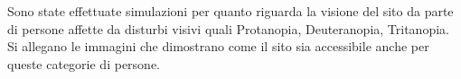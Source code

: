 \documentclass[12pt]{article}
\begin{document}
		Sono state effettuate simulazioni per quanto riguarda la visione del sito da parte di persone affette da disturbi visivi quali Protanopia, Deuteranopia, Tritanopia. Si allegano le immagini che dimostrano come il sito sia accessibile anche per queste categorie di persone.
	\vspace{2cm}
	
	\begin{figure}[H]
	\centering
	\end{figure}
   	
	\newpage
	
\end{document}
